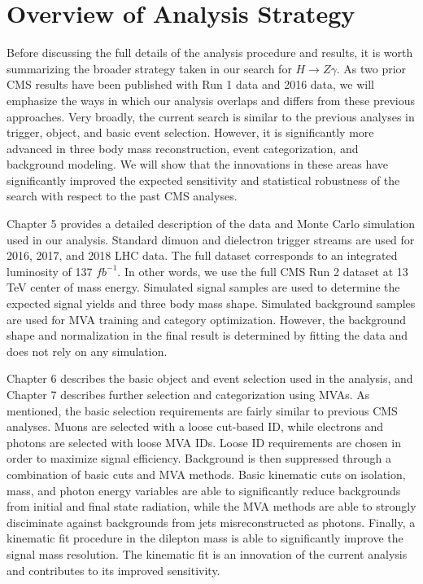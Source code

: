 \chapter{Overview of Analysis Strategy}

Before discussing the full details of the analysis procedure and results, it is worth summarizing 
the broader strategy taken in our search for $H \rightarrow Z\gamma$. As two prior CMS results have 
been published with Run 1 data and 2016 data, we will emphasize the ways in which our analysis
overlaps and differs from these previous approaches. Very broadly, the current search is 
similar to the previous analyses in trigger, object, and basic event selection. 
However, it is significantly more advanced in three body mass reconstruction, 
event categorization, and background modeling. We will show that the innovations in these 
areas have significantly improved the expected sensitivity and statistical robustness of the search 
with respect to the past CMS analyses.

Chapter 5 provides a detailed description of the data and Monte Carlo simulation 
used in our analysis. Standard dimuon and dielectron trigger streams are used for 2016, 2017, 
and 2018 LHC data. The full dataset corresponds to an integrated luminosity of 
137 $fb^{-1}$. In other words, we use the full CMS Run 2 dataset at 13 TeV center of 
mass energy. Simulated signal samples are used to determine the expected signal yields 
and three body mass shape. Simulated background samples are used for MVA training 
and category optimization. However, the background shape and normalization in the final result
is determined by fitting the data and does not rely on any simulation.

Chapter 6 describes the basic object and event selection used in the analysis, and Chapter 7 
describes further selection and categorization using MVAs. As mentioned, the basic 
selection requirements are fairly similar to previous CMS analyses. Muons are selected with 
a loose cut-based ID, while electrons and photons are selected with loose MVA IDs. Loose ID
requirements are chosen in order to maximize signal efficiency. Background is then suppressed 
through a combination of basic cuts and MVA methods. Basic kinematic cuts on isolation, mass, 
and photon energy variables are able to significantly reduce backgrounds from initial and final 
state radiation, while the MVA methods are able to strongly disciminate against backgrounds from 
jets misreconstructed as photons. Finally, a kinematic fit procedure in the dilepton mass 
is able to significantly improve the signal mass resolution. The kinematic fit is an 
innovation of the current analysis and contributes to its improved sensitivity.

